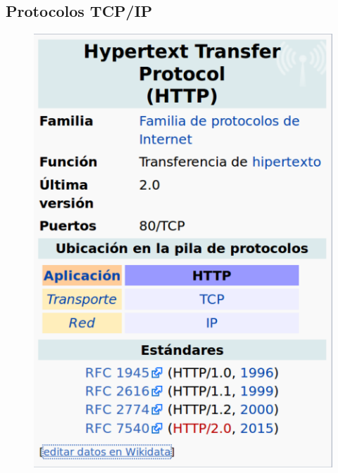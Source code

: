 \documentclass[4paper]{article}
\begin{document}
\subsection{Protocolos TCP/IP}
\begin{figure}[H]
\includegraphics[scale=1.2]{../imagenes/http.png}
\end{figure}
\newpage
\end{document}
